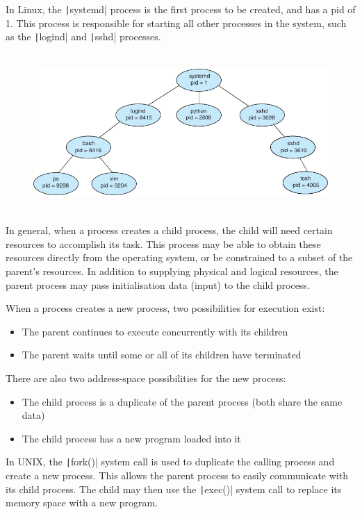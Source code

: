 \documentclass{article}
\begin{document}
In Linux, the \texttt|systemd| process is the first process
to be created, and has a pid of 1. This process is responsible for
starting all other processes in the system, such as the
\texttt|logind| and \texttt|sshd| processes.
\begin{figure}[H]
    \centering
    \includegraphics[height = 6cm]{figures/linux_process_tree.pdf}
\end{figure}
In general, when a process creates a child process, the child will
need certain resources to accomplish its task.
This process may be able to obtain these resources directly from the
operating system, or be constrained to a subset of the parent's
resources.
In addition to supplying physical and logical resources, the parent
process may pass initialisation data (input) to the child process.

When a process creates a new process, two possibilities for execution
exist:
\begin{itemize}
    \item The parent continues to execute concurrently with its
          children
    \item The parent waits until some or all of its children have
          terminated
\end{itemize}
There are also two address-space possibilities for
the new process:
\begin{itemize}
    \item The child process is a duplicate of the parent process (both
          share the same data)
    \item The child process has a new program loaded into it
\end{itemize}
In UNIX,
the \texttt|fork()| system call is used to
duplicate the calling process and create a new
process.
This allows the parent process to easily communicate with its child
process.
The child may then use the \texttt|exec()| system call to
replace its memory space with a new program.
\end{document}
